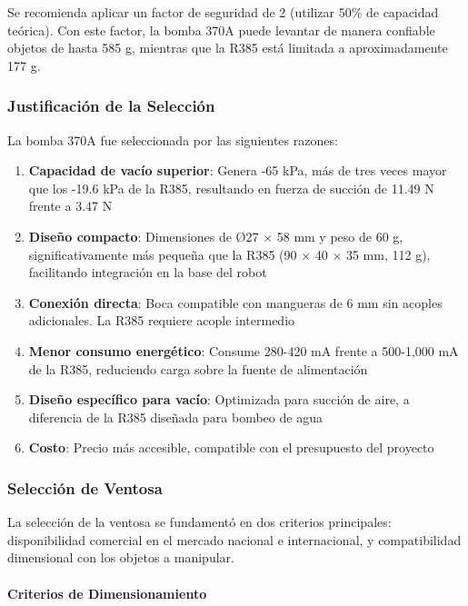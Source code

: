 Se recomienda aplicar un factor de seguridad de 2 (utilizar 50\% de capacidad teórica). Con este factor, la bomba 370A puede levantar de manera confiable objetos de hasta 585 g, mientras que la R385 está limitada a aproximadamente 177 g.

\subsubsection{Justificación de la Selección}

La bomba 370A fue seleccionada por las siguientes razones:

\begin{enumerate}
    \item \textbf{Capacidad de vacío superior}: Genera -65 kPa, más de tres veces mayor que los -19.6 kPa de la R385, resultando en fuerza de succión de 11.49 N frente a 3.47 N
    
    \item \textbf{Diseño compacto}: Dimensiones de Ø27 × 58 mm y peso de 60 g, significativamente más pequeña que la R385 (90 × 40 × 35 mm, 112 g), facilitando integración en la base del robot
    
    \item \textbf{Conexión directa}: Boca compatible con mangueras de 6 mm sin acoples adicionales. La R385 requiere acople intermedio
    
    \item \textbf{Menor consumo energético}: Consume 280-420 mA frente a 500-1,000 mA de la R385, reduciendo carga sobre la fuente de alimentación
    
    \item \textbf{Diseño específico para vacío}: Optimizada para succión de aire, a diferencia de la R385 diseñada para bombeo de agua
    
    \item \textbf{Costo}: Precio más accesible, compatible con el presupuesto del proyecto
\end{enumerate}

\subsubsection{Selección de Ventosa}

La selección de la ventosa se fundamentó en dos criterios principales: disponibilidad comercial en el mercado nacional e internacional, y compatibilidad dimensional con los objetos a manipular.

\paragraph{Criterios de Dimensionamiento}

